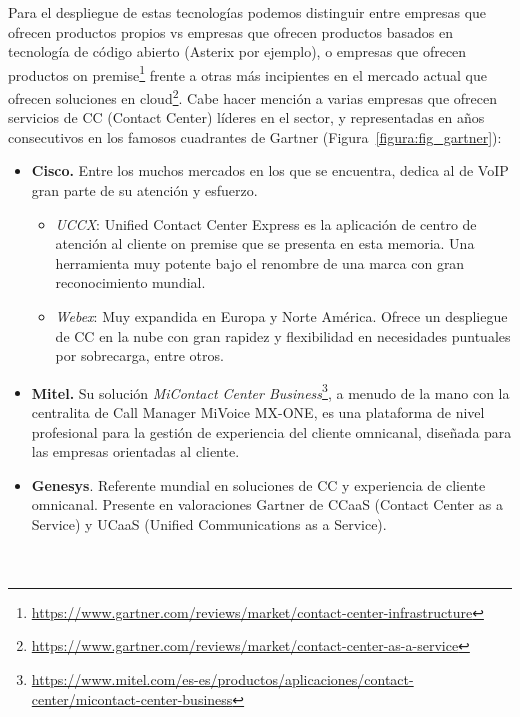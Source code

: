 \documentclass[a4paper, 12pt]{book}
\begin{document}
Para el despliegue de estas tecnologías podemos distinguir entre empresas que ofrecen productos propios vs empresas que ofrecen productos basados en tecnología de código abierto (Asterix por ejemplo), o empresas que ofrecen productos on premise\footnote{\url{https://www.gartner.com/reviews/market/contact-center-infrastructure}} frente a otras más incipientes en el mercado actual que ofrecen soluciones en cloud\footnote{\url{https://www.gartner.com/reviews/market/contact-center-as-a-service}}. Cabe hacer mención a varias empresas que ofrecen servicios de CC (Contact Center)  líderes en el sector, y representadas en años consecutivos en los famosos cuadrantes de Gartner (Figura~\ref{figura:fig_gartner}):
\begin{itemize}
  \item \textbf{Cisco.} Entre los muchos mercados en los que se encuentra, dedica al de VoIP gran parte de su atención y esfuerzo.   

  \begin{itemize}
    \item \emph{UCCX}: Unified Contact Center Express es la aplicación de centro de atención al cliente on premise que se presenta en esta memoria. Una herramienta muy potente bajo el renombre de una marca con gran reconocimiento mundial.
    \item \emph{Webex}: Muy expandida en Europa y Norte América. Ofrece un despliegue de CC en la nube con gran rapidez y flexibilidad en necesidades puntuales por sobrecarga, entre otros.
  \end{itemize}  

  \item \textbf{Mitel.} Su solución \emph{MiContact Center Business}\footnote{\url{https://www.mitel.com/es-es/productos/aplicaciones/contact-center/micontact-center-business}}, a menudo de la mano con la centralita de Call Manager MiVoice MX-ONE, es una plataforma de nivel profesional para la gestión de experiencia del cliente omnicanal, diseñada para las empresas orientadas al cliente.

  \item \textbf{Genesys}. Referente mundial en soluciones de CC y experiencia de cliente omnicanal. Presente en valoraciones Gartner de CCaaS (Contact Center as a Service) y UCaaS (Unified Communications as a Service).\\
  \\
  \\

\end{itemize}
\end{document}
